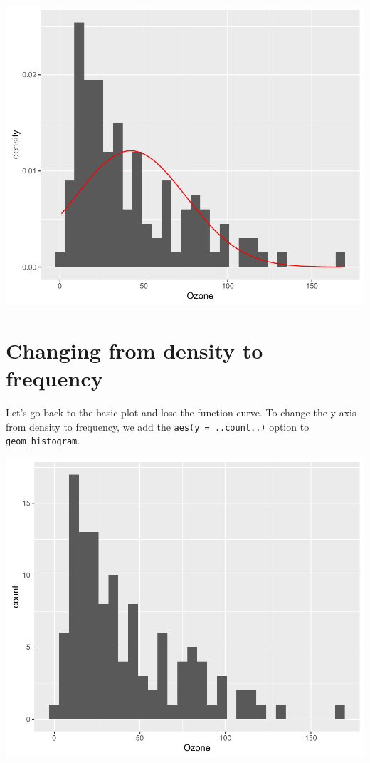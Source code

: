 \begin{center}\includegraphics[width=0.6\linewidth]{7_Histograms_pdf/histogram_2-1} \end{center}

\section{Changing from density to
frequency}\label{changing-from-density-to-frequency}

Let's go back to the basic plot and lose the function curve. To change
the y-axis from density to frequency, we add the
\texttt{aes(y\ =\ ..count..)} option to \texttt{geom\_histogram}.

\begin{Shaded}
\begin{Highlighting}[]
\StringTok{ }\NormalTok{(} \StringTok{ }
\StringTok{  }\NormalTok{(}\NormalTok{(} 
\end{Highlighting}
\end{Shaded}

\begin{center}\includegraphics[width=0.6\linewidth]{7_Histograms_pdf/histogram_3-1} \end{center}

